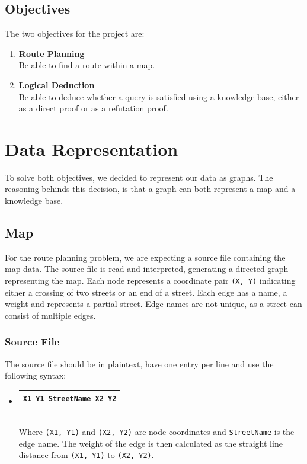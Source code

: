 \documentclass[11pt]{article}
\newcommand{\tbox}[1] {\begin{tabular}{| c |}\hline {#1} \\ \hline\end{tabular}}
\begin{document}
\subsection{Objectives}
The two objectives for the project are:
\begin{enumerate}
	\item[] \textbf{Route Planning}\\
	Be able to find a route within a map.
	
	\item[] \textbf{Logical Deduction}\\
	Be able to deduce whether a query is satisfied using a knowledge base, either as a direct proof or as a refutation proof. 
\end{enumerate}

\section{Data Representation}
To solve both objectives, we decided to represent our data as graphs. The reasoning behinds this decision, is that a graph can both represent a map and a knowledge base.

\subsection{Map}
For the route planning problem, we are expecting a source file containing the map data. The source file is read and interpreted, generating a directed graph representing the map. Each node represents a coordinate pair {\tt (X, Y)} indicating either a crossing of two streets or an end of a street. Each edge has a name, a weight and represents a partial street. Edge names are not unique, as a street can consist of multiple edges.

\subsubsection{Source File}
The source file should be in plaintext, have one entry per line and use the following syntax:
\begin{itemize}
	\item \tbox{\tt X1 Y1 StreetName X2 Y2}\\
	Where {\tt (X1, Y1)} and {\tt (X2, Y2)} are node coordinates and {\tt StreetName} is the edge name. The weight of the edge is then calculated as the straight line distance from {\tt (X1, Y1)} to {\tt (X2, Y2)}.
\end{itemize}
\end{document}
